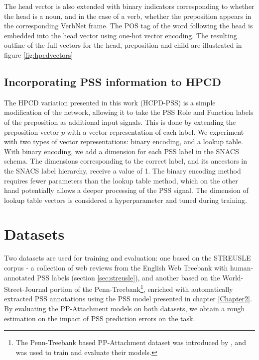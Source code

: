 The head vector is also extended with binary indicators corresponding to whether the head is a noun, and in the case of a verb, whether the preposition appears in the corresponding VerbNet frame. The POS tag of the word following the head is embedded into the head vector using one-hot vector encoding. The resulting outline of the full vectors for the head, preposition and child are illustrated in figure \ref{fig:hpcdvectors}

\subsection{Incorporating PSS information to HPCD} \label{sec:hpcd_pss}

The HPCD variation presented in this work (HCPD-PSS) is a simple modification of the network, allowing it to take the PSS Role and Function labels of the preposition as additional input signals. This is done by extending the preposition vector $p$ with a vector representation of each label. We experiment with two types of vector representations: binary encoding, and a lookup table. With binary encoding, we add a dimension for each PSS label in the SNACS schema. The dimensions corresponding to the correct label, and its ancestors in the SNACS label hierarchy, receive a value of 1. The binary encoding method requires fewer parameters than the lookup table method, which on the other hand potentially allows a deeper processing of the PSS signal. The dimension of lookup table vectors is considered a hyperparameter and tuned during training.

\section{Datasets} \label{sec:ppatt_datasets}

Two datasets are used for training and evaluation: one based on the STREUSLE corpus - a collection of web reviews from the English Web Treebank with human-annotated PSS labels (section \ref{sec:streusle}), and another based on the World-Street-Journal portion of the Penn-Treebank\footnote{The Penn-Treebank based PP-Attachment dataset was introduced by \cite{hpcd}, and was used to train and evaluate their models.}, enriched with automatically extracted PSS annotations using the PSS model presented in chapter \ref{Chapter2}. By evaluating the PP-Attachment models on both datasets, we obtain a rough estimation on the impact of PSS prediction errors on the task.

